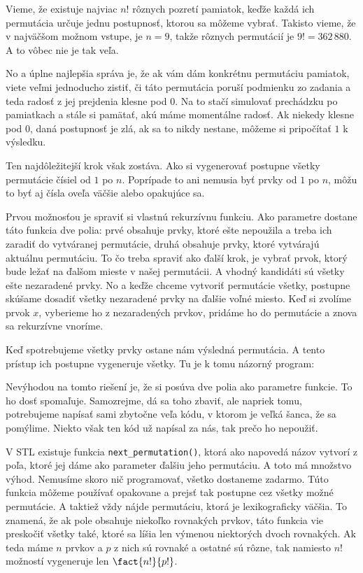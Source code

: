 Vieme, že existuje najviac $n!$ rôznych pozretí pamiatok, keďže každá ich permutácia určuje jednu
postupnosť, ktorou sa môžeme vybrať. Takisto vieme, že v najväčšom možnom vstupe, je $n=9$, takže
rôznych permutácií je $9!=362\,880$. A to vôbec nie je tak veľa.

No a úplne najlepšia správa je, že ak vám dám konkrétnu permutáciu pamiatok, viete veľmi jednoducho
zistiť, či táto permutácia poruší podmienku zo zadania a teda radosť z jej prejdenia klesne pod $0$.
Na to stačí simulovať prechádzku po pamiatkach a stále si pamätať, akú máme momentálne radosť. Ak
niekedy klesne pod $0$, daná postupnosť je zlá, ak sa to nikdy nestane, môžeme si pripočítať $1$ k
výsledku.

Ten najdôležitejší krok však zostáva. Ako si vygenerovať postupne všetky permutácie čísiel od $1$ po
$n$. Poprípade to ani nemusia byť prvky od $1$ po $n$, môžu to byť aj čísla oveľa väčšie alebo
opakujúce sa.

\medskip

Prvou možnosťou je spraviť si vlastnú rekurzívnu funkciu. Ako parametre dostane táto funkcia dve
polia: prvé obsahuje prvky, ktoré ešte nepoužila a treba ich zaradiť do vytváranej permutácie, druhá
obsahuje prvky, ktoré vytvárajú aktuálnu permutáciu. To čo treba spraviť ako ďalší krok, je vybrať
prvok, ktorý bude ležať na ďalšom mieste v našej permutácii. A vhodný kandidáti sú všetky ešte
nezaradené prvky. No a keďže chceme vytvoriť permutácie všetky, postupne skúšame dosadiť všetky
nezaradené prvky na ďalšie voľné miesto. Keď si zvolíme prvok $x$, vyberieme ho z nezaradených prvkov,
pridáme ho do permutácie a znova sa rekurzívne vnoríme.

Keď spotrebujeme všetky prvky ostane nám výsledná permutácia. A tento prístup ich postupne
vygeneruje všetky. Tu je k tomu názorný program:


Nevýhodou na tomto riešení je, že si posúva dve polia ako parametre funkcie. To ho dosť spomaľuje.
Samozrejme, dá sa toho zbaviť, ale napriek tomu, potrebujeme napísať sami zbytočne veľa kódu, v
ktorom je veľká šanca, že sa pomýlime. Niekto však ten kód už napísal za nás, tak prečo ho nepoužiť.

V STL existuje funkcia \texttt{next_permutation()}, ktorá ako napovedá názov vytvorí z poľa, ktoré
jej dáme ako parameter ďalšiu jeho permutáciu. A toto má množstvo výhod. Nemusíme skoro nič
programovať, všetko dostaneme zadarmo. Túto funkcia môžeme používať opakovane a prejsť tak postupne
cez všetky možné permutácie. A taktiež vždy nájde permutáciu, ktorá je lexikograficky väčšia. To
znamená, že ak pole obsahuje niekoľko rovnakých prvkov, táto funkcia vie preskočiť všetky také,
ktoré sa líšia len výmenou niektorých dvoch rovnakých. Ak teda máme $n$ prvkov a $p$ z nich sú
rovnaké a ostatné sú rôzne, tak namiesto $n!$ možností vygeneruje len $\fact{n!}{p!}$.

